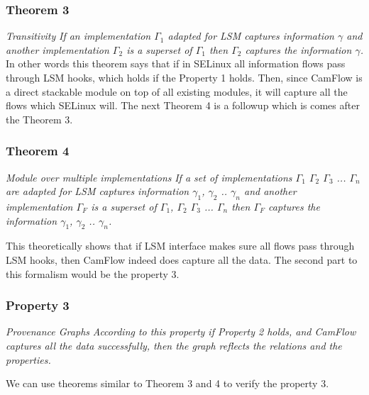 \subsubsection{Theorem 3}\textit{Transitivity}
\vskip 0.1in
\textit{If an implementation $\Gamma_1$ adapted for LSM  captures information $\gamma$ and another implementation $\Gamma_2$ is a superset of $\Gamma_1$ then $\Gamma_2$ captures the information $\gamma$.}
\vskip 0.2in
In other words this theorem says that if in SELinux all information flows pass through LSM hooks, which holds if the Property 1 holds. Then, since CamFlow is a direct stackable module on top of all existing modules, it will capture all the flows which SELinux will. The next Theorem 4 is a followup which is comes after the Theorem 3.

\subsubsection{Theorem 4}\textit{Module over multiple implementations}
\vskip 0.1in
\textit{If a set of implementations $\Gamma_1$ $\Gamma_2$ $\Gamma_3$ ... $\Gamma_n$ are adapted for LSM  captures information $\gamma_1$, $\gamma_2$ .. $\gamma_n$ and another implementation $\Gamma_F$ is a superset of $\Gamma_1$, $\Gamma_2$ $\Gamma_3$ ... $\Gamma_n$  then $\Gamma_F$ captures the information $\gamma_1$, $\gamma_2$ .. $\gamma_n$.}
\vskip 0.2in

This theoretically shows that if LSM interface makes sure all flows pass through LSM hooks, then CamFlow indeed does capture all the data. The second part to this formalism would be the property 3.

\subsubsection{Property 3} \textit{Provenance Graphs}
\vskip 0.1in
\textit{According to this property if Property 2 holds, and CamFlow captures all the data successfully, then the graph reflects the relations and the properties. }

We can use  theorems similar to Theorem 3 and 4 to verify the property 3. 



